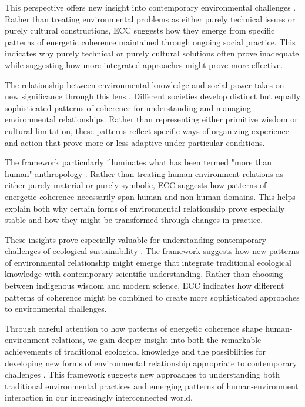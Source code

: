 This perspective offers new insight into contemporary environmental challenges \cite{tsing2015mushroom}. Rather than treating environmental problems as either purely technical issues or purely cultural constructions, ECC suggests how they emerge from specific patterns of energetic coherence maintained through ongoing social practice. This indicates why purely technical or purely cultural solutions often prove inadequate while suggesting how more integrated approaches might prove more effective.

The relationship between environmental knowledge and social power takes on new significance through this lens \cite{palsson2015nature}. Different societies develop distinct but equally sophisticated patterns of coherence for understanding and managing environmental relationships. Rather than representing either primitive wisdom or cultural limitation, these patterns reflect specific ways of organizing experience and action that prove more or less adaptive under particular conditions.

The framework particularly illuminates what has been termed "more than human" anthropology \cite{kohn2013forests}. Rather than treating human-environment relations as either purely material or purely symbolic, ECC suggests how patterns of energetic coherence necessarily span human and non-human domains. This helps explain both why certain forms of environmental relationship prove especially stable and how they might be transformed through changes in practice.

These insights prove especially valuable for understanding contemporary challenges of ecological sustainability \cite{viveiros2014cannibal}. The framework suggests how new patterns of environmental relationship might emerge that integrate traditional ecological knowledge with contemporary scientific understanding. Rather than choosing between indigenous wisdom and modern science, ECC indicates how different patterns of coherence might be combined to create more sophisticated approaches to environmental challenges.

Through careful attention to how patterns of energetic coherence shape human-environment relations, we gain deeper insight into both the remarkable achievements of traditional ecological knowledge and the possibilities for developing new forms of environmental relationship appropriate to contemporary challenges \cite{strathern1980nature}. This framework suggests new approaches to understanding both traditional environmental practices and emerging patterns of human-environment interaction in our increasingly interconnected world.